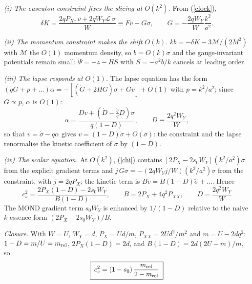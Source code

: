 \documentclass[11pt,letterpaper]{article}
\begin{document}
\emph{(i) The cuscuton constraint fixes the slicing at $O(k^2)$.} From (\ref{clock}),
\begin{equation}
\delta K=\frac{2qP_{X\tau}\,v+2qW_Y\mathcal L\,\sigma}{W}\equiv Fv+G\sigma,\qquad G=-\frac{2qW_Y}{W}\frac{k^2}{a^2}.
\end{equation}

\emph{(ii) The momentum constraint makes the shift $O(k)$.} $kb=-\delta K-3\mathcal M/(2M^2)$ with $\mathcal M$ the $O(1)$ momentum density, so $b=O(k)\sigma$ and the gauge-invariant potentials remain small: $\Psi=-z-HS$ with $S=-a^2b/k$ cancels at leading order.

\emph{(iii) The lapse responds at $O(1)$.} The lapse equation has the form $(qG+p+\dots)\alpha=-[(\dot G+2HG)\sigma+Gv]+O(1)$ with $p=k^2/a^2$; since $G\propto p$, $\alpha$ is $O(1)$:
\begin{equation}
\alpha=\frac{Dv+(\dot D-\tfrac{\dot q}{q}D)\sigma}{q(1-D)},\qquad D\equiv\frac{2q^2W_Y}{W},
\end{equation}
so that $v=\dot\sigma-q\alpha$ gives $v=(1-D)\dot\sigma+O(\sigma)$: the constraint and the lapse renormalise the kinetic coefficient of $\sigma$ by $(1-D)$.

\emph{(iv) The scalar equation.} At $O(k^2)$, (\ref{chi}) contains $[2P_X-2s_0W_Y](k^2/a^2)\sigma$ from the explicit gradient terms and $j\,G\sigma=-(2qW_Yj/W)(k^2/a^2)\sigma$ from the constraint, with $j=2qP_X$; the kinetic term is $B\dot v=B(1-D)\ddot\sigma+\dots$. Hence
\begin{equation}
\boxed{\;c_s^2=\frac{2P_X(1-D)-2s_0W_Y}{B(1-D)},\qquad B=2P_X+4q^2P_{XX},\qquad D=\frac{2q^2W_Y}{W}\;}
\label{general}
\end{equation}
The MOND gradient term $s_0W_Y$ is enhanced by $1/(1-D)$ relative to the naive $k$-essence form $(2P_X-2s_0W_Y)/B$.

\emph{Closure.} With $W=U$, $W_Y=d$, $P_X=Ud/m$, $P_{XX}=2Ud^2/m^2$ and $m=U-2dq^2$: $1-D=m/U=m_{\rm rel}$, $2P_X(1-D)=2d$, and $B(1-D)=2d(2U-m)/m$, so
\begin{equation}
\boxed{\;c_s^2=(1-s_0)\,\frac{m_{\rm rel}}{2-m_{\rm rel}}\;}
\label{closure}
\end{equation}
\end{document}
